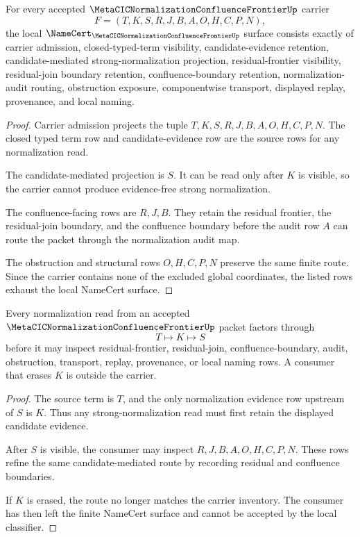 \begin{theorem}
\label{thm:metacic-normalization-confluence-frontier-namecert-obligations}
For every accepted $\MetaCICNormalizationConfluenceFrontierUp$ carrier
$$
F=(T,K,S,R,J,B,A,O,H,C,P,N),
$$
the local $\NameCert_{\MetaCICNormalizationConfluenceFrontierUp}$ surface consists exactly of carrier admission, closed-typed-term visibility, candidate-evidence retention, candidate-mediated strong-normalization projection, residual-frontier visibility, residual-join boundary retention, confluence-boundary retention, normalization-audit routing, obstruction exposure, componentwise transport, displayed replay, provenance, and local naming.
\end{theorem}
\begin{proof}
Carrier admission projects the tuple $T,K,S,R,J,B,A,O,H,C,P,N$. The closed typed term row and candidate-evidence row are the source rows for any normalization read.

The candidate-mediated projection is $S$. It can be read only after $K$ is visible, so the carrier cannot produce evidence-free strong normalization.

The confluence-facing rows are $R,J,B$. They retain the residual frontier, the residual-join boundary, and the confluence boundary before the audit row $A$ can route the packet through the normalization audit map.

The obstruction and structural rows $O,H,C,P,N$ preserve the same finite route. Since the carrier contains none of the excluded global coordinates, the listed rows exhaust the local NameCert surface.
\end{proof}

\begin{theorem}
\label{thm:metacic-normalization-confluence-frontier-candidate-gate}
Every normalization read from an accepted $\MetaCICNormalizationConfluenceFrontierUp$ packet factors through
$$
T \longmapsto K \longmapsto S
$$
before it may inspect residual-frontier, residual-join, confluence-boundary, audit, obstruction, transport, replay, provenance, or local naming rows. A consumer that erases $K$ is outside the carrier.
\end{theorem}
\begin{proof}
The source term is $T$, and the only normalization evidence row upstream of $S$ is $K$. Thus any strong-normalization read must first retain the displayed candidate evidence.

After $S$ is visible, the consumer may inspect $R,J,B,A,O,H,C,P,N$. These rows refine the same candidate-mediated route by recording residual and confluence boundaries.

If $K$ is erased, the route no longer matches the carrier inventory. The consumer has then left the finite NameCert surface and cannot be accepted by the local classifier.
\end{proof}

